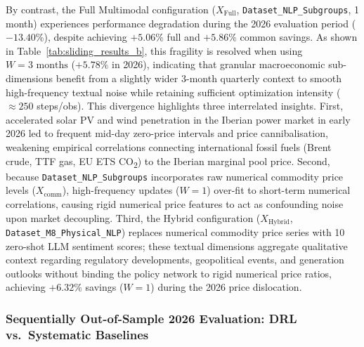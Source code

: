 By contrast, the Full Multimodal configuration ($X_{\text{Full}}$, \texttt{Dataset\_\allowbreak NLP\_\allowbreak Subgroups}, 1 month) experiences performance degradation during the 2026 evaluation period ($-13.40\%$), despite achieving $+5.06\%$ full and $+5.86\%$ common savings. As shown in Table~\ref{tab:sliding_results_b}, this fragility is resolved when using $W=3\text{ months}$ ($+5.78\%$ in 2026), indicating that granular macroeconomic sub-dimensions benefit from a slightly wider 3-month quarterly context to smooth high-frequency textual noise while retaining sufficient optimization intensity ($\approx 250$ steps/obs). This divergence highlights three interrelated insights. First, accelerated solar PV and wind penetration in the Iberian power market in early 2026 led to frequent mid-day zero-price intervals and price cannibalisation, weakening empirical correlations connecting international fossil fuels (Brent crude, TTF gas, EU ETS CO\textsubscript{2}) to the Iberian marginal pool price. Second, because \texttt{Dataset\_\allowbreak NLP\_\allowbreak Subgroups} incorporates raw numerical commodity price levels ($X_{\text{comm}}$), high-frequency updates ($W=1$) over-fit to short-term numerical correlations, causing rigid numerical price features to act as confounding noise upon market decoupling. Third, the Hybrid configuration ($X_{\text{Hybrid}}$, \texttt{Dataset\_\allowbreak M8\_\allowbreak Physical\_\allowbreak NLP}) replaces numerical commodity price series with 10 zero-shot LLM sentiment scores; these textual dimensions aggregate qualitative context regarding regulatory developments, geopolitical events, and generation outlooks without binding the policy network to rigid numerical price ratios, achieving $+6.32\%$ savings ($W=1$) during the 2026 price dislocation.

\subsubsection{Sequentially Out-of-Sample 2026 Evaluation: DRL vs.\ Systematic Baselines}
\label{subsec:results_2026}

